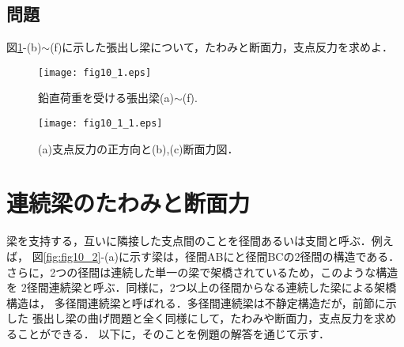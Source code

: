 \documentclass[10pt,a4j]{jarticle}
\begin{document}
\subsection{問題}
図\ref{fig:fig10_1}-(b)$\sim$(f)に示した張出し梁について，たわみと断面力，支点反力を求めよ．
\begin{figure}[h]
	\begin{center}
	\texttt{[image: fig10\_1.eps]} 
	\end{center}
	\caption{
	鉛直荷重を受ける張出梁(a)$\sim$(f).
	} 
	\label{fig:fig10_1}
\end{figure}
\begin{figure}[h]
	\begin{center}
	\texttt{[image: fig10\_1\_1.eps]} 
	\end{center}
	\caption{
	(a)支点反力の正方向と(b),(c)断面力図．
	} 
	\label{fig:fig10_1_1}
\end{figure}
%
%
%
\section{連続梁のたわみと断面力}
梁を支持する，互いに隣接した支点間のことを径間あるいは支間と呼ぶ．例えば，
図\ref{fig:fig10_2}-(a)に示す梁は，径間ABにと径間BCの2径間の構造である．
さらに，2つの径間は連続した単一の梁で架橋されているため，このような構造を
2径間連続梁と呼ぶ．同様に，2つ以上の径間からなる連続した梁による架橋構造は，
多径間連続梁と呼ばれる．多径間連続梁は不静定構造だが，前節に示した
張出し梁の曲げ問題と全く同様にして，たわみや断面力，支点反力を求めることができる．
以下に，そのことを例題の解答を通じて示す．
\end{document}
